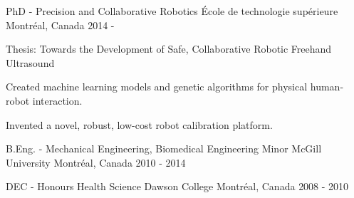 \documentclass[11pt, letterpaper]{awesome-cv}
\begin{document}
\makecvheader


\begin{cventries}

\cventry
{PhD - Precision and Collaborative Robotics}
{École de technologie supérieure}
{Montréal, Canada}
{2014 - }
{
\begin{cvitems} 
\item{Thesis: Towards the Development of Safe, Collaborative Robotic Freehand Ultrasound}
\item{Created machine learning models and genetic algorithms for physical human-robot interaction.}
\item{Invented a novel, robust, low-cost robot calibration platform.}
\end{cvitems}
}

\cventry
{B.Eng. - Mechanical Engineering, Biomedical Engineering Minor}
{McGill University}
{Montréal, Canada}
{2010 - 2014}
{
\begin{cvitems}
\end{cvitems}
}

\cventry
{DEC - Honours Health Science}
{Dawson College}
{Montréal, Canada}
{2008 - 2010}
{
\begin{cvitems} 
\end{cvitems}
}

\end{cventries}

\end{document}

